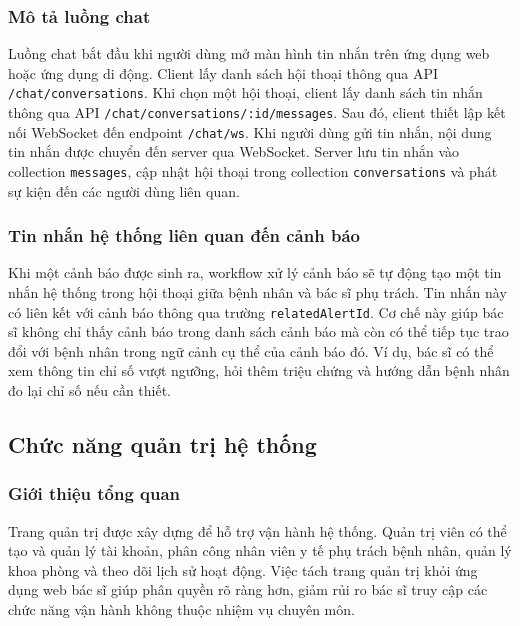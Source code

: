 \subsubsection{Mô tả luồng chat}
\par Luồng chat bắt đầu khi người dùng mở màn hình tin nhắn trên ứng dụng web hoặc ứng dụng di động. Client lấy danh sách hội thoại thông qua API \texttt{/chat/conversations}. Khi chọn một hội thoại, client lấy danh sách tin nhắn thông qua API \texttt{/chat/conversations/:id/messages}. Sau đó, client thiết lập kết nối WebSocket đến endpoint \texttt{/chat/ws}. Khi người dùng gửi tin nhắn, nội dung tin nhắn được chuyển đến server qua WebSocket. Server lưu tin nhắn vào collection \texttt{messages}, cập nhật hội thoại trong collection \texttt{conversations} và phát sự kiện đến các người dùng liên quan.

\subsubsection{Tin nhắn hệ thống liên quan đến cảnh báo}
\par Khi một cảnh báo được sinh ra, workflow xử lý cảnh báo sẽ tự động tạo một tin nhắn hệ thống trong hội thoại giữa bệnh nhân và bác sĩ phụ trách. Tin nhắn này có liên kết với cảnh báo thông qua trường \texttt{relatedAlertId}. Cơ chế này giúp bác sĩ không chỉ thấy cảnh báo trong danh sách cảnh báo mà còn có thể tiếp tục trao đổi với bệnh nhân trong ngữ cảnh cụ thể của cảnh báo đó. Ví dụ, bác sĩ có thể xem thông tin chỉ số vượt ngưỡng, hỏi thêm triệu chứng và hướng dẫn bệnh nhân đo lại chỉ số nếu cần thiết.

\subsection{Chức năng quản trị hệ thống}

\subsubsection{Giới thiệu tổng quan}
\par Trang quản trị được xây dựng để hỗ trợ vận hành hệ thống. Quản trị viên có thể tạo và quản lý tài khoản, phân công nhân viên y tế phụ trách bệnh nhân, quản lý khoa phòng và theo dõi lịch sử hoạt động. Việc tách trang quản trị khỏi ứng dụng web bác sĩ giúp phân quyền rõ ràng hơn, giảm rủi ro bác sĩ truy cập các chức năng vận hành không thuộc nhiệm vụ chuyên môn.

